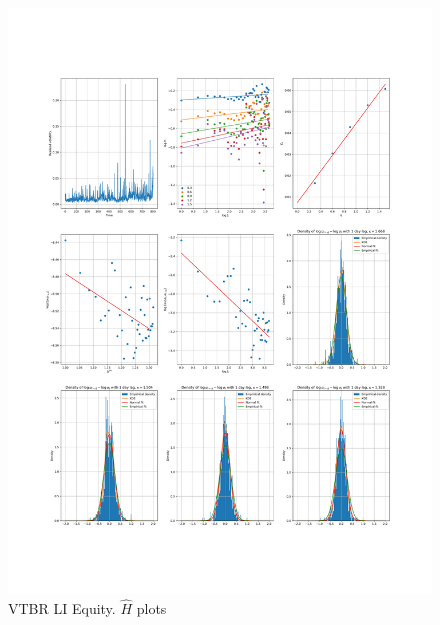     \begin{figure}[h]
        \centering
        \includegraphics[width=\textwidth]{fig/VTBR LI Equity.pdf}
        \caption{VTBR LI Equity. $\hat{H}$ plots}
    \end{figure} 
        
